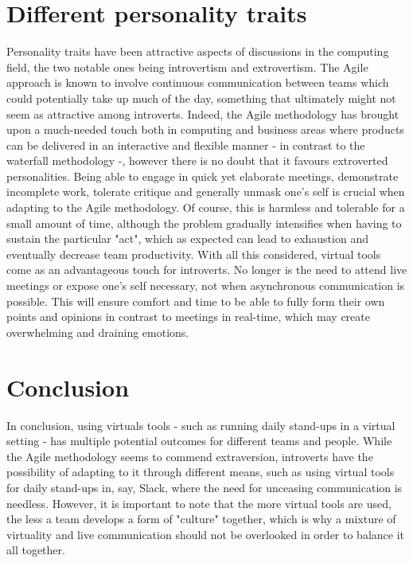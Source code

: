 \documentclass{scrartcl}
\begin{document}
\section{Different personality traits}
Personality traits have been attractive aspects of discussions in the computing field, the two notable ones being introvertism and extrovertism. The Agile approach is known to involve continuous communication between teams which could potentially take up much of the day, something that ultimately might not seem as attractive among introverts. Indeed, the Agile methodology has brought upon a much-needed touch both in computing and business areas where products can be delivered in an interactive and flexible manner - in contrast to the waterfall methodology -, however there is no doubt that it favours extroverted personalities. Being able to engage in quick yet elaborate meetings, demonstrate incomplete work, tolerate critique and generally unmask one's self is crucial when adapting to the Agile methodology. Of course, this is harmless and tolerable for a small amount of time, although the problem gradually intensifies when having to sustain the particular "act", which as expected can lead to exhaustion and eventually decrease team productivity. With all this considered, virtual tools come as an advantageous touch for introverts. No longer is the need to attend live meetings or expose one's self necessary, not when asynchronous communication is possible. This will ensure comfort and time to be able to fully form their own points and opinions in contrast to meetings in real-time, which may create overwhelming and draining emotions. 

\section{Conclusion}
In conclusion, using virtuals tools - such as running daily stand-ups in a virtual setting - has multiple potential outcomes for different teams and people. While the Agile methodology seems to commend extraversion, introverts have the possibility of adapting to it through different means, such as using virtual tools for daily stand-ups in, say, Slack, where the need for unceasing communication is needless. However, it is important to note that the more virtual tools are used, the less a team develops a form of "culture" together, which is why a mixture of virtuality and live communication should not be overlooked in order to balance it all together.



\end{document}
